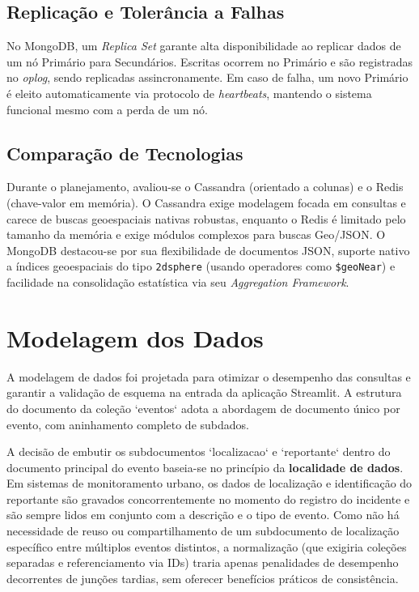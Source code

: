 \documentclass[12pt]{article}
\begin{document}
\subsection{Replicação e Tolerância a Falhas}

No MongoDB, um \textit{Replica Set} garante alta disponibilidade ao replicar dados de um nó Primário para Secundários. Escritas ocorrem no Primário e são registradas no \textit{oplog}, sendo replicadas assincronamente. Em caso de falha, um novo Primário é eleito automaticamente via protocolo de \textit{heartbeats}, mantendo o sistema funcional mesmo com a perda de um nó.

\subsection{Comparação de Tecnologias}

Durante o planejamento, avaliou-se o Cassandra (orientado a colunas) e o Redis (chave-valor em memória). O Cassandra exige modelagem focada em consultas e carece de buscas geoespaciais nativas robustas, enquanto o Redis é limitado pelo tamanho da memória e exige módulos complexos para buscas Geo/JSON. O MongoDB destacou-se por sua flexibilidade de documentos JSON, suporte nativo a índices geoespaciais do tipo \texttt{2dsphere} (usando operadores como \texttt{\$geoNear}) e facilidade na consolidação estatística via seu \textit{Aggregation Framework}.

\section{Modelagem dos Dados}
\label{sec:modelagem}

A modelagem de dados foi projetada para otimizar o desempenho das consultas e garantir a validação de esquema na entrada da aplicação Streamlit. A estrutura do documento da coleção `eventos` adota a abordagem de documento único por evento, com aninhamento completo de subdados.

A decisão de embutir os subdocumentos `localizacao` e `reportante` dentro do documento principal do evento baseia-se no princípio da \textbf{localidade de dados}. Em sistemas de monitoramento urbano, os dados de localização e identificação do reportante são gravados concorrentemente no momento do registro do incidente e são sempre lidos em conjunto com a descrição e o tipo de evento. Como não há necessidade de reuso ou compartilhamento de um subdocumento de localização específico entre múltiplos eventos distintos, a normalização (que exigiria coleções separadas e referenciamento via IDs) traria apenas penalidades de desempenho decorrentes de junções tardias, sem oferecer benefícios práticos de consistência.
\end{document}
